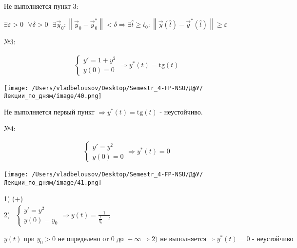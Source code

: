 \documentclass[12pt, a4paper]{report}
\begin{document}
Не выполняется пункт 3: 

\( \exists \varepsilon > 0 \text{ }  \forall  \delta > 0 \text{ }  \exists  \vec{y } _0 : \left\lVert  \vec{y }  _0 - \vec{y } _ 0 ^*  \right\rVert < \delta \Rightarrow   \exists  \hat{t }  \ge t_0 : \left\lVert \vec{y } (\hat{ t } )- \vec{y } ^*    (\hat{ t } )  \right\rVert \ge \varepsilon  \) 

№3: 

\[\begin{aligned}
    \begin{cases}
        y ' = 1 + y ^2 \\ 
        y(0 ) = 0
    \end{cases} 
    \Rightarrow y^* (t ) = \mathrm{tg }  (t ) 
\end{aligned}\] 

\begin{center}
    \texttt{[image: /Users/vladbelousov/Desktop/Semestr\_4-FP-NSU/ДфУ/Лекции\_по\_дням/image/40.png]}
\end{center}

Не выполняется первый пункт \( \Rightarrow y^*(t ) = \mathrm{tg } (t ) \)  - неустойчиво. 

№4: 

\[ \begin{aligned}
    \begin{cases}
        y ' = y ^2 \\ 
        y(0 ) = 0
    \end{cases}
    \Rightarrow y^* (t ) = 0
\end{aligned} \] 

\begin{center}
    \texttt{[image: /Users/vladbelousov/Desktop/Semestr\_4-FP-NSU/ДфУ/Лекции\_по\_дням/image/41.png]}
\end{center}

1) (+) \\



2) \( \begin{aligned}
\begin{cases}
    y' = y ^2 \\ 
    y(0 ) = y_0
\end{cases}
\Rightarrow y(t ) = \frac{1}{\displaystyle  \frac{1}{y_0 } -t  } 
\end{aligned} \) 

\[ y(t ) \text{ при }  y_0> 0 \text{ не определено от } 0 \text{ до }  + \infty   \Rightarrow 2) \text{ не выполняется}\Rightarrow y^{* } (t )= 0 \text{ - неустойчиво}  \] 
\end{document}
